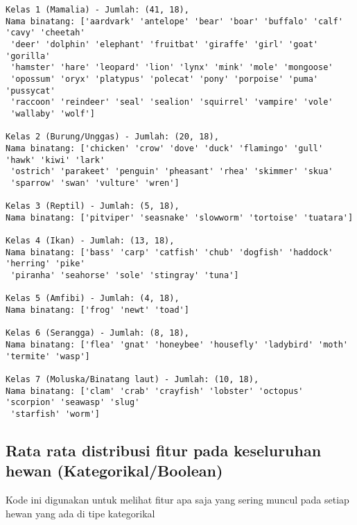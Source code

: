 \documentclass[
  letterpaper,
]{krantz}
\begin{document}
\begin{verbatim}
Kelas 1 (Mamalia) - Jumlah: (41, 18),
Nama binatang: ['aardvark' 'antelope' 'bear' 'boar' 'buffalo' 'calf' 'cavy' 'cheetah'
 'deer' 'dolphin' 'elephant' 'fruitbat' 'giraffe' 'girl' 'goat' 'gorilla'
 'hamster' 'hare' 'leopard' 'lion' 'lynx' 'mink' 'mole' 'mongoose'
 'opossum' 'oryx' 'platypus' 'polecat' 'pony' 'porpoise' 'puma' 'pussycat'
 'raccoon' 'reindeer' 'seal' 'sealion' 'squirrel' 'vampire' 'vole'
 'wallaby' 'wolf']

Kelas 2 (Burung/Unggas) - Jumlah: (20, 18),
Nama binatang: ['chicken' 'crow' 'dove' 'duck' 'flamingo' 'gull' 'hawk' 'kiwi' 'lark'
 'ostrich' 'parakeet' 'penguin' 'pheasant' 'rhea' 'skimmer' 'skua'
 'sparrow' 'swan' 'vulture' 'wren']

Kelas 3 (Reptil) - Jumlah: (5, 18),
Nama binatang: ['pitviper' 'seasnake' 'slowworm' 'tortoise' 'tuatara']

Kelas 4 (Ikan) - Jumlah: (13, 18),
Nama binatang: ['bass' 'carp' 'catfish' 'chub' 'dogfish' 'haddock' 'herring' 'pike'
 'piranha' 'seahorse' 'sole' 'stingray' 'tuna']

Kelas 5 (Amfibi) - Jumlah: (4, 18),
Nama binatang: ['frog' 'newt' 'toad']

Kelas 6 (Serangga) - Jumlah: (8, 18),
Nama binatang: ['flea' 'gnat' 'honeybee' 'housefly' 'ladybird' 'moth' 'termite' 'wasp']

Kelas 7 (Moluska/Binatang laut) - Jumlah: (10, 18),
Nama binatang: ['clam' 'crab' 'crayfish' 'lobster' 'octopus' 'scorpion' 'seawasp' 'slug'
 'starfish' 'worm']
\end{verbatim}

\hypertarget{rata-rata-distribusi-fitur-pada-keseluruhan-hewan-kategorikalboolean}{%
\subsection{Rata rata distribusi fitur pada keseluruhan hewan
(Kategorikal/Boolean)}\label{rata-rata-distribusi-fitur-pada-keseluruhan-hewan-kategorikalboolean}}

Kode ini digunakan untuk melihat fitur apa saja yang sering muncul pada
setiap hewan yang ada di tipe kategorikal
\end{document}
